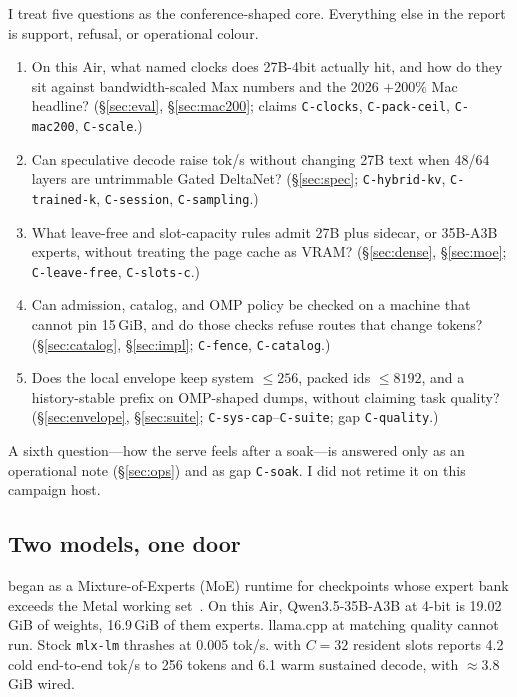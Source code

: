 I treat five questions as the conference-shaped core. Everything else in the report is support, refusal, or operational colour.

\begin{enumerate}[leftmargin=1.8em,itemsep=0.35em]
\item[\textbf{RQ1}] On this Air, what named clocks does 27B-4bit actually hit, and how do they sit against bandwidth-scaled Max numbers and the 2026 ${+}200\%$ Mac headline? (\S\ref{sec:eval}, \S\ref{sec:mac200}; claims \texttt{C-clocks}, \texttt{C-pack-ceil}, \texttt{C-mac200}, \texttt{C-scale}.)
\item[\textbf{RQ2}] Can speculative decode raise tok/s without changing 27B text when 48/64 layers are untrimmable Gated DeltaNet? (\S\ref{sec:spec}; \texttt{C-hybrid-kv}, \texttt{C-trained-k}, \texttt{C-session}, \texttt{C-sampling}.)
\item[\textbf{RQ3}] What leave-free and slot-capacity rules admit 27B plus sidecar, or 35B-A3B experts, without treating the page cache as VRAM? (\S\ref{sec:dense}, \S\ref{sec:moe}; \texttt{C-leave-free}, \texttt{C-slots-c}.)
\item[\textbf{RQ4}] Can admission, catalog, and OMP policy be checked on a machine that cannot pin 15\,GiB, and do those checks refuse routes that change tokens? (\S\ref{sec:catalog}, \S\ref{sec:impl}; \texttt{C-fence}, \texttt{C-catalog}.)
\item[\textbf{RQ5}] Does the local envelope keep system $\le 256$, packed ids $\le 8192$, and a history-stable prefix on OMP-shaped dumps, without claiming task quality? (\S\ref{sec:envelope}, \S\ref{sec:suite}; \texttt{C-sys-cap}--\texttt{C-suite}; gap \texttt{C-quality}.)
\end{enumerate}

A sixth question---how the serve feels after a soak---is answered only as an operational note (\S\ref{sec:ops}) and as gap \texttt{C-soak}. I did not retime it on this campaign host.

\subsection{Two models, one door}

\slotbank{} began as a Mixture-of-Experts (MoE) runtime for checkpoints whose expert bank exceeds the Metal working set~\citep{shazeer2017moe,fedus2022switch}. On this Air, Qwen3.5-35B-A3B at 4-bit is 19.02\,GiB of weights, 16.9\,GiB of them experts. llama.cpp at matching quality cannot run. Stock \texttt{mlx-lm} thrashes at 0.005 tok/s. \slotbank{} with $C{=}32$ resident slots reports 4.2 cold end-to-end tok/s to 256 tokens and 6.1 warm sustained decode, with $\approx 3.8$\,GiB wired.


